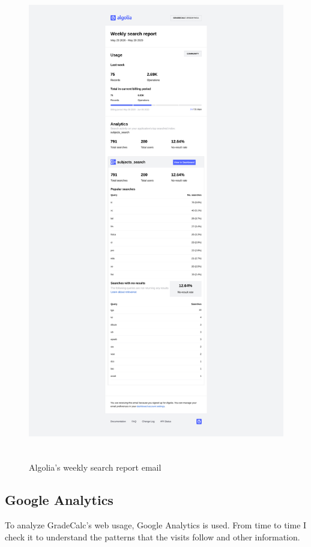 \vfill
\begin{figure}[ht!]
    \center
    \includegraphics[height=21cm]{media/algolia-email.pdf}
    \caption{Algolia's weekly search report email}
    \label{algolia-email}
\end{figure}
\vfill

\clearpage\newpage
\subsection{Google Analytics}

To analyze GradeCalc's web usage, Google Analytics is used. From time to time I check it to understand the patterns that the visits follow and other information. 

